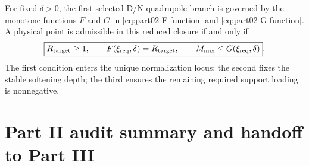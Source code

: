 \begin{theorem}
\label{thm:part02-FG-frontier}
For fixed \(\delta>0\), the first selected D/N quadrupole branch is governed by the monotone functions \(F\) and \(G\) in \eqref{eq:part02-F-function} and \eqref{eq:part02-G-function}.  A physical point is admissible in this reduced closure if and only if
\begin{equation}
\label{eq:part02-final-admissibility}
\boxed{
R_{\rm target}\geq1,
\qquad
F(\xi_{\rm req},\delta)=R_{\rm target},
\qquad
M_{\rm mix}\leq G(\xi_{\rm req},\delta)}.
\end{equation}
The first condition enters the unique normalization locus; the second fixes the stable softening depth; the third ensures the remaining required support loading is nonnegative.
\end{theorem}

\section{Part II audit summary and handoff to Part III}
\label{sec:part02-audit-summary}

